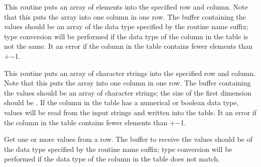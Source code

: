 This routine puts an array of elements into the specified row and column.
Note that this puts the array into one column in one row.
The buffer containing the values should be an array
of the data type specified by the routine name suffix;
type conversion will be performed
if the data type of the column in the table is not the same.
It  an error if the column in the table
contains fewer elements than $+$$-$1.

\callseqtable

\begin{callseq}
\end{callseq}

This routine puts an array of character strings
into the specified row and column.
Note that this puts the array into one column in one row.
The buffer containing the values should be an array of character strings;
the size of the first dimension should be .
If the column in the table has a numerical or boolean data type,
values will be read from the input strings
and written into the table.
It  an error if the column in the table
contains fewer elements than $+$$-$1.

\callseqtable

\begin{callseq}
\end{callseq}

Get one or more values from a row.
The buffer to receive the values should be
of the data type specified by the routine name suffix;
type conversion will be performed
if the data type of the column in the table does not match.


